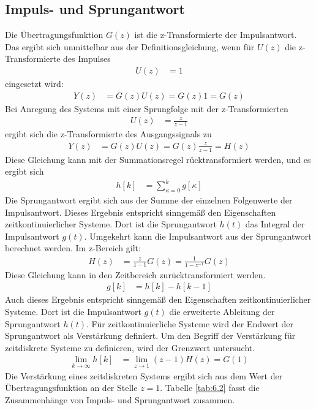 \subsection{Impuls- und Sprungantwort}\label{sec:impuls--und-sprungantwort}

Die Übertragungsfunktion \(G(z)\) ist die z-Transformierte der Impulsantwort. Das ergibt sich unmittelbar aus der Definitionsgleichung, wenn für \(U(z)\) die z-Transformierte des Impulses
\begin{align}
U(z) &= 1 \label{eq:6.33}
\end{align}
eingesetzt wird:
\begin{align}
Y(z) &= G(z)  U(z) = G(z)  1 = G(z) \label{eq:6.34}
\end{align}
Bei Anregung des Systems mit einer Sprungfolge mit der z-Transformierten
\begin{align}
U(z) &= \frac{z}{z - 1} \label{eq:6.35}
\end{align}
ergibt sich die z-Transformierte des Ausgangssignals zu
\begin{align}
Y(z) &= G(z)  U(z) = G(z)  \frac{z}{z - 1} = H(z) \label{eq:6.36}
\end{align}
Diese Gleichung kann mit der Summationsregel rücktransformiert werden, und es ergibt sich
\begin{align}
h[ k] &= \sum\limits_{\kappa = 0}^{k}{g[\kappa]} \label{eq:6.37}
\end{align}
Die Sprungantwort ergibt sich aus der Summe der einzelnen Folgenwerte der Impulsantwort. Dieses Ergebnis entspricht sinngemäß den Eigenschaften zeitkontinuierlicher Systeme. Dort ist die Sprungantwort \(h(t)\) das Integral der Impulsantwort \(g(t)\). Umgekehrt kann die Impulsantwort aus der Sprungantwort berechnet werden. Im z-Bereich gilt:
\begin{align}
H(z) &= \frac{z}{z - 1}  G(z) = \frac{1}{1 - z^{- 1}}  G(z) \label{eq:6.38}
\end{align}
Diese Gleichung kann in den Zeitbereich zurücktransformiert werden.
\begin{align}
g[ k] &= h[ k] - h[ k - 1] \label{eq:6.39}
\end{align}
Auch dieses Ergebnis entspricht sinngemäß den Eigenschaften zeitkontinuierlicher Systeme. Dort ist die Impulsantwort \(g(t)\) die erweiterte Ableitung der Sprungantwort \(h(t)\). Für zeitkontinuierliche Systeme wird der Endwert der Sprungantwort als Verstärkung definiert. Um den Begriff der Verstärkung für zeitdiskrete Systeme zu definieren, wird der Grenzwert untersucht.
\begin{align}
\lim_{k \rightarrow \infty}h[ k] &= \lim_{z \rightarrow 1}(z - 1)  H(z) = G(1) \label{eq:6.40}
\end{align}
Die Verstärkung eines zeitdiskreten Systems ergibt sich aus dem Wert der Übertragungsfunktion an der Stelle \(z = 1\). Tabelle \ref{tab:6.2} fasst die Zusammenhänge von Impuls- und Sprungantwort zusammen.

